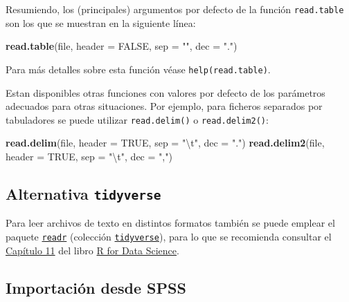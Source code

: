\documentclass[]{book}
\newenvironment{Shaded}{\begin{snugshade}}{\end{snugshade}}
\newcommand{\KeywordTok}[1]{\textcolor[rgb]{0.13,0.29,0.53}{\textbf{#1}}}
\newcommand{\DataTypeTok}[1]{\textcolor[rgb]{0.13,0.29,0.53}{#1}}
\newcommand{\CharTok}[1]{\textcolor[rgb]{0.31,0.60,0.02}{#1}}
\newcommand{\StringTok}[1]{\textcolor[rgb]{0.31,0.60,0.02}{#1}}
\newcommand{\OtherTok}[1]{\textcolor[rgb]{0.56,0.35,0.01}{#1}}
\newcommand{\NormalTok}[1]{#1}
\begin{document}
Resumiendo, los (principales) argumentos por defecto de la función
\texttt{read.table} son los que se muestran en la siguiente línea:

\begin{Shaded}
\begin{Highlighting}[]
\KeywordTok{read.table}\NormalTok{(file, }\DataTypeTok{header =} \OtherTok{FALSE}\NormalTok{, }\DataTypeTok{sep =} \StringTok{""}\NormalTok{, }\DataTypeTok{dec =} \StringTok{"."}\NormalTok{)  }
\end{Highlighting}
\end{Shaded}

Para más detalles sobre esta función véase \texttt{help(read.table)}.

Estan disponibles otras funciones con valores por defecto de los
parámetros adecuados para otras situaciones. Por ejemplo, para ficheros
separados por tabuladores se puede utilizar \texttt{read.delim()} o
\texttt{read.delim2()}:

\begin{Shaded}
\begin{Highlighting}[]
\KeywordTok{read.delim}\NormalTok{(file, }\DataTypeTok{header =} \OtherTok{TRUE}\NormalTok{, }\DataTypeTok{sep =} \StringTok{"}\CharTok{\textbackslash{}t}\StringTok{"}\NormalTok{, }\DataTypeTok{dec =} \StringTok{"."}\NormalTok{)}
\KeywordTok{read.delim2}\NormalTok{(file, }\DataTypeTok{header =} \OtherTok{TRUE}\NormalTok{, }\DataTypeTok{sep =} \StringTok{"}\CharTok{\textbackslash{}t}\StringTok{"}\NormalTok{, }\DataTypeTok{dec =} \StringTok{","}\NormalTok{)}
\end{Highlighting}
\end{Shaded}

\subsection{\texorpdfstring{Alternativa
\texttt{tidyverse}}{Alternativa tidyverse}}\label{alternativa-tidyverse}

Para leer archivos de texto en distintos formatos también se puede
emplear el paquete \href{https://readr.tidyverse.org}{\texttt{readr}}
(colección \href{https://www.tidyverse.org/}{\texttt{tidyverse}}), para
lo que se recomienda consultar el
\href{https://r4ds.had.co.nz/data-import.html}{Capítulo 11} del libro
\href{http://r4ds.had.co.nz}{R for Data Science}.

\subsection{Importación desde SPSS}\label{importacion-desde-spss}
\end{document}
